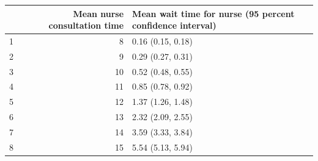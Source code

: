 \begin{table}[ht]
\centering
\begin{tabular}{rrl}
  \hline
 & Mean nurse consultation time & Mean wait time for nurse (95 percent confidence interval) \\ 
  \hline
1 &   8 & 0.16 (0.15, 0.18) \\ 
  2 &   9 & 0.29 (0.27, 0.31) \\ 
  3 &  10 & 0.52 (0.48, 0.55) \\ 
  4 &  11 & 0.85 (0.78, 0.92) \\ 
  5 &  12 & 1.37 (1.26, 1.48) \\ 
  6 &  13 & 2.32 (2.09, 2.55) \\ 
  7 &  14 & 3.59 (3.33, 3.84) \\ 
  8 &  15 & 5.54 (5.13, 5.94) \\ 
   \hline
\end{tabular}
\end{table}
